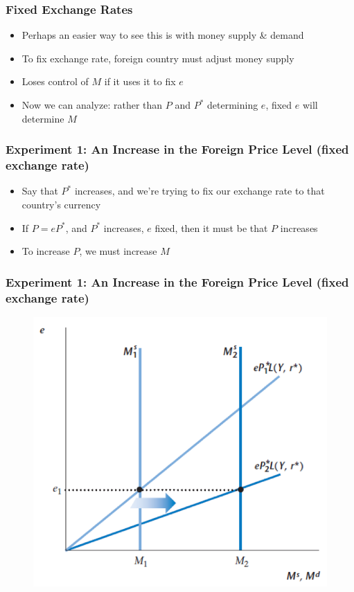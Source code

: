 \documentclass{beamer}
\begin{document}
\begin{frame}
\frametitle[alignment=center]{ Fixed Exchange Rates}
\begin{itemize}
\item Perhaps an easier way to see this is with money supply \& demand
\bigskip
\item To fix exchange rate, foreign country must adjust money supply 
\bigskip
\item Loses control of $M$ if it uses it to fix $e$
\bigskip
\item Now we can analyze:  rather than $P$ and $P^*$ determining $e$, fixed $e$ will determine $M$
\end{itemize}
\end{frame}


\begin{frame}
\frametitle[alignment=center]{ Experiment 1:  An Increase in the Foreign Price Level (fixed exchange rate)}
\begin{itemize}
\item Say that $P^*$ increases, and we're trying to fix our exchange rate to that country's currency
\bigskip
\item If $P=eP^*$, and $P^*$ increases, $e$ fixed, then it must be that $P$ increases
\bigskip
\item To increase $P$, we must increase $M$
\end{itemize}
\end{frame}



\begin{frame}
\frametitle[alignment=center]{Experiment 1:  An Increase in the Foreign Price Level (fixed exchange rate)}
\begin{figure}
\centering
\includegraphics[scale=0.73]{Figures/W_Fig_17pt8.png}
\end{figure}
\end{frame}
\end{document}

